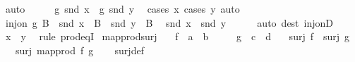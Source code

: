 \begin{isabellebody}
\ auto\isanewline
\ \ \isamarkupfalse%
\ \isamarkupfalse%
\ {\isachardoublequoteopen}g\ {\isacharparenleft}{\kern0pt}snd\ x{\isacharparenright}{\kern0pt}\ {\isacharequal}{\kern0pt}\ g\ {\isacharparenleft}{\kern0pt}snd\ y{\isacharparenright}{\kern0pt}{\isachardoublequoteclose}\ \isamarkupfalse%
\ {\isacharparenleft}{\kern0pt}cases\ x{\isacharcomma}{\kern0pt}\ cases\ y{\isacharparenright}{\kern0pt}\ auto\isanewline
\ \ \isamarkupfalse%
\ {\isacartoucheopen}inj{\isacharunderscore}{\kern0pt}on\ g\ B{\isacartoucheclose}\ \ {\isacartoucheopen}snd\ x\ {\isasymin}\ B{\isacartoucheclose}\ \ {\isacartoucheopen}snd\ y\ {\isasymin}\ B{\isacartoucheclose}\ \isamarkupfalse%
\ {\isachardoublequoteopen}snd\ x\ {\isacharequal}{\kern0pt}\ snd\ y{\isachardoublequoteclose}\isanewline
\ \ \ \ \isamarkupfalse%
\ {\isacharparenleft}{\kern0pt}auto\ dest{\isacharcolon}{\kern0pt}\ inj{\isacharunderscore}{\kern0pt}onD{\isacharparenright}{\kern0pt}\isanewline
\ \ \isamarkupfalse%
\ \isamarkupfalse%
\ {\isachardoublequoteopen}x\ {\isacharequal}{\kern0pt}\ y{\isachardoublequoteclose}\ \isamarkupfalse%
\ {\isacharparenleft}{\kern0pt}rule\ prod{\isacharunderscore}{\kern0pt}eqI{\isacharparenright}{\kern0pt}\isanewline
{}\isamarkupfalse%
%
\endisatagproof
{\isafoldproof}%
%
\isadelimproof
\isanewline
%
\endisadelimproof
\isanewline
{}\isamarkupfalse%
\ map{\isacharunderscore}{\kern0pt}prod{\isacharunderscore}{\kern0pt}surj{\isacharcolon}{\kern0pt}\isanewline
\ \ \ f\ {\isacharcolon}{\kern0pt}{\isacharcolon}{\kern0pt}\ {\isachardoublequoteopen}{\isacharprime}{\kern0pt}a\ {\isasymRightarrow}\ {\isacharprime}{\kern0pt}b{\isachardoublequoteclose}\isanewline
\ \ \ \ \ g\ {\isacharcolon}{\kern0pt}{\isacharcolon}{\kern0pt}\ {\isachardoublequoteopen}{\isacharprime}{\kern0pt}c\ {\isasymRightarrow}\ {\isacharprime}{\kern0pt}d{\isachardoublequoteclose}\isanewline
\ \ \ {\isachardoublequoteopen}surj\ f{\isachardoublequoteclose}\ \ {\isachardoublequoteopen}surj\ g{\isachardoublequoteclose}\isanewline
\ \ \ {\isachardoublequoteopen}surj\ {\isacharparenleft}{\kern0pt}map{\isacharunderscore}{\kern0pt}prod\ f\ g{\isacharparenright}{\kern0pt}{\isachardoublequoteclose}\isanewline
%
\isadelimproof
\ \ %
\endisadelimproof
%
\isatagproof
{}\isamarkupfalse%
\ surj{\isacharunderscore}{\kern0pt}def\isanewline

\end{isabellebody}
